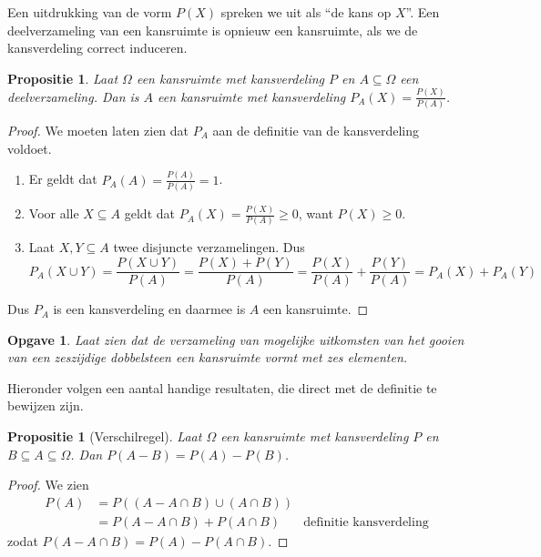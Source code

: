 \documentclass[a4paper]{book}
\newtheorem{proposition}[theorem]{Propositie}
\newtheorem{exercise}[theorem]{Opgave}
\theoremstyle{definition}
\begin{document}
Een uitdrukking van de vorm $P(X)$ spreken we uit als ``de kans op $X$''.
Een deelverzameling van een kansruimte is opnieuw een kansruimte, als we de kansverdeling correct induceren.
\begin{proposition}
    Laat $\Omega$ een kansruimte met kansverdeling $P$ en $A \subseteq \Omega$ een deelverzameling.
    Dan is $A$ een kansruimte met kansverdeling $P_A(X) = \frac{P(X)}{P(A)}$.
\end{proposition}
\begin{proof}
    We moeten laten zien dat $P_A$ aan de definitie van de kansverdeling voldoet.
    \begin{enumerate}[i]
        \item Er geldt dat $P_A(A) = \frac{P(A)}{P(A)} = 1$.
        \item Voor alle $X \subseteq A$ geldt dat $P_A(X) = \frac{P(X)}{P(A)} \geq 0$, want $P(X) \geq 0$.
        \item Laat $X,Y \subseteq A$ twee disjuncte verzamelingen.
            Dus \[ P_A(X \cup Y) = \frac{P(X \cup Y)}{P(A)} = \frac{P(X) + P(Y)}{P(A)} = \frac{P(X)}{P(A)} + \frac{P(Y)}{P(A)} = P_A(X) + P_A(Y) \]
    \end{enumerate}
    Dus $P_A$ is een kansverdeling en daarmee is $A$ een kansruimte.
\end{proof}

\begin{exercise}
    Laat zien dat de verzameling van mogelijke uitkomsten van het gooien van een zeszijdige dobbelsteen een kansruimte vormt met zes elementen.
\end{exercise}

Hieronder volgen een aantal handige resultaten, die direct met de definitie te bewijzen zijn.
\begin{proposition}[Verschilregel]\label{verschilregel}
    Laat $\Omega$ een kansruimte met kansverdeling $P$ en $B \subseteq A \subseteq \Omega$.
    Dan $P(A - B) = P(A) - P(B)$.
\end{proposition}
\begin{proof}
    We zien
    \begin{align*}
        P(A)    &= P( (A - A \cap B) \cup (A \cap B) ) \\
                &= P(A - A \cap B ) + P(A \cap B) & \text{definitie kansverdeling}
    \end{align*}
    zodat $P(A - A \cap B ) = P(A) - P(A \cap B) $.
\end{proof}
\end{document}
